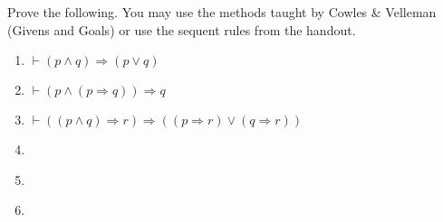 \documentclass[11pt]{article}
\begin{document}

Prove the following.  You may use the methods taught by Cowles \&
Velleman (Givens and Goals) or use the sequent rules from the handout.

\goodbreak\noindent
\begin{enumerate}
\item  $\vdash (p\wedge{}q) \Rightarrow (p\vee{}q)$\\
\item  $\vdash  (p \wedge (p \Rightarrow q)) \Rightarrow q$\\
\item   $\vdash ((p \wedge q) \Rightarrow r) \Rightarrow ((p \Rightarrow r) \vee (q \Rightarrow r))$\\

\item{} \\

\item{} \\

\item{} \\




\end{enumerate}
\end{document}
